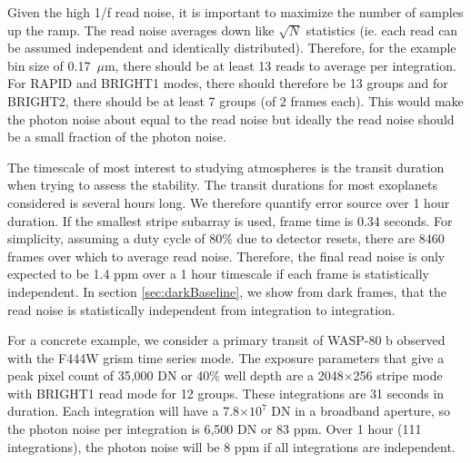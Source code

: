 \documentclass{aastex62}
\begin{document}
Given the high 1/f read noise, it is important to maximize the number of samples up the ramp.
The read noise averages down like $\sqrt{N}$ statistics (ie. each read can be assumed independent and identically distributed).
Therefore, for the example bin size of 0.17~$\mu$m, there should be at least 13 reads to average per integration.
For RAPID and BRIGHT1 modes, there should therefore be 13 groups and for BRIGHT2, there should be at least 7 groups (of 2 frames each).
This would make the photon noise about equal to the read noise but ideally the read noise should be a small fraction of the photon noise.


The timescale of most interest to studying atmospheres is the transit duration when trying to assess the stability.
The transit durations for most exoplanets considered is several hours long.
We therefore quantify error source over 1 hour duration.
If the smallest stripe subarray is used, frame time is 0.34 seconds.
For simplicity, assuming a duty cycle of 80\% due to detector resets, there are 8460 frames over which to average read noise.
Therefore, the final read noise is only expected to be 1.4 ppm over a 1 hour timescale if each frame is statistically independent.
In section \ref{sec:darkBaseline}, we show from dark frames, that the read noise is statistically independent from integration to integration.

For a concrete example, we consider a primary transit of WASP-80 b observed with the F444W grism time series mode.
The exposure parameters that give a peak pixel count of 35,000 DN or 40\% well depth are a 2048$\times$256 stripe mode with BRIGHT1 read mode for 12 groups.
These integrations are 31 seconds in duration.
Each integration will have a 7.8$\times 10^7$ DN in a broadband aperture, so the photon noise per integration is 6,500 DN or 83 ppm.
Over 1 hour (111 integrations), the photon noise will be 8 ppm if all integrations are independent.
\end{document}

